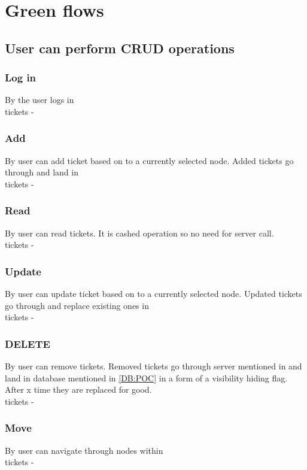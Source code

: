 
\section{Green flows}
\subsection{User can perform CRUD operations}\label{GF:CRUD}
\subsubsection{Log in}\label{GF:CRUD:LOGIN}
By the  user logs in \\
tickets - 
\subsubsection{Add}\label{GF:CRUD:ADD}
By  user can add ticket based on  
to a currently selected node. Added tickets go through  and land in \\
tickets - 
\subsubsection{Read}\label{GF:CRUD:READ}
By  user can read tickets. It is cashed operation so no need for server call.\\
tickets - 
\subsubsection{Update}\label{GF:CRUD:UP}
By  user can update ticket based on  
to a currently selected node. Updated tickets go through  and replace existing ones in \\
tickets - 
\subsubsection{DELETE}\label{GF:CRUD:DEL}
By  user can remove tickets. Removed tickets go through server mentioned 
in  and land in database mentioned in \ref{DB:POC} in a form of a visibility 
hiding flag. After x time they are replaced for good.\\
tickets - 
\subsubsection{Move}\label{GF:CRUD:MOV}
By  user can navigate through nodes within \\
tickets - 

